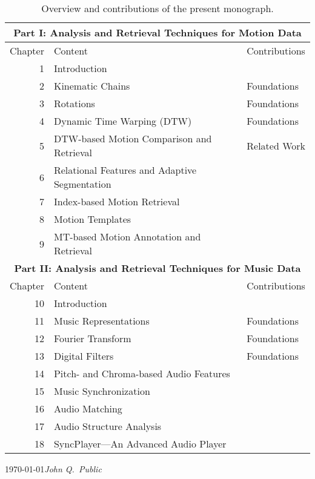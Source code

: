 \begin{table}[t]
\renewcommand{\arraystretch}{1.2}
\begin{center}
\small
\begin{tabular}{|r|l|l|}
\hline
\multicolumn{3}{|c|}{\textbf{Part I: Analysis and Retrieval Techniques for Motion Data}}\\
\hline
Chapter & Content & Contributions\\
\hline
1 & Introduction &\\
2 & Kinematic Chains & Foundations \\
3 & Rotations & Foundations \\
4 & Dynamic Time Warping (DTW) & Foundations \\
5 & DTW-based Motion Comparison and Retrieval & Related Work\\
6 & Relational Features and Adaptive Segmentation &\cite{MuRo07_DAGSTUHL} \cite{MuRoCl05_SIGGRAPH}\\
7 & Index-based Motion Retrieval & \cite{DeRoMuEb06_ECIR} \cite{MuRoCl05_SIGGRAPH} \cite{MuRoCl06_CBMI} \cite{MuRoCl07_CGA}\\
8 & Motion Templates &\cite{MuRo06_SCA} \\
9 & MT-based Motion Annotation and Retrieval &\cite{MuRo06_SCA} \cite{MuRo07_HDM}\\
\hline \hline
\multicolumn{3}{|c|}{\textbf{Part II: Analysis and Retrieval Techniques for Music Data}}\\
\hline
Chapter & Content & Contributions\\
\hline
10 & Introduction & \\
11 & Music Representations & Foundations\\
12 & Fourier Transform & Foundations\\
13 & Digital Filters & Foundations\\
14 & Pitch- and Chroma-based Audio Features &\cite{MuKu07_EURASIP} \cite{MuKuCl05_ismir_audiomatching} \cite{MuKuCl05_WASPAA_audiomatching} \cite{MuKuRo04_ismir}\\
15 & Music Synchronization &\cite{ArClKuMu04_CMMR} \cite{ArClKuMu04_CM} \cite{MuKuCl05_GI_sync} \cite{MuKuCl06_DatenbankSpektrum} \cite{MuKuRo04_ismir} \cite{MuMaKu06_ismir_MsDTW}\\
16 & Audio Matching &\cite{KuMu07_audioMatchingIndex} \cite{MuKuCl05_ismir_audiomatching} \cite{MuKuCl06_DatenbankSpektrum}\\
17 & Audio Structure Analysis &\cite{MuKu06_ICASSP} \cite{MuKu07_EURASIP} \cite{MuKuCl06_DatenbankSpektrum}\\
18 & SyncPlayer---An Advanced Audio Player &\cite{ClKuMu04_ECDL} \cite{FrKuMu07_InterIntra_NIMES} \cite{KuMu07_syncPlayer_Sringer} \cite{KuMu05_ismir_syncPlayer} \cite{KuMu04_ISMIR_service}\\
\hline
\end{tabular}
\end{center}
\caption{
    Overview and contributions of the present monograph.
}
\label{table:contributions}
\end{table}

\bigskip

\today \hfill \emph{John Q.~Public}


\cleardoublepage
